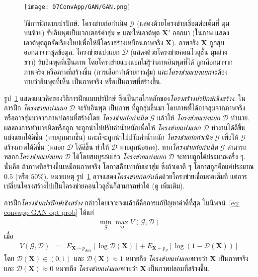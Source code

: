%
\begin{figure}
\begin{center}
\texttt{[image: 07ConvApp/GAN/GAN.png]}
\caption[วิธีการฝึกแบบปรปักษ์]{วิธีการฝึกแบบปรปักษ์. 
โครงข่ายก่อกำเนิด 
$\mathcal{G}$ (แสดงด้วยโครงข่ายเชื่อมต่อเต็มที่ มุมบนซ้าย) รับอินพุตเป็นเวกเตอร์ค่าสุ่ม $\bm{z}$
และให้เอาต์พุต $\bm{X}'$ ออกมา (ในภาพ แสดงเอาต์พุตถูกจัดเรียงใหม่เพื่อให้มีโครงสร้างเหมือนภาพจริง $\bm{X}$).
ภาพจริง $\bm{X}$ ถูกสุ่มออกมาจากชุดข้อมูล. 
โครงข่ายแบ่งแยก $\mathcal{D}$ (แสดงด้วยโครงข่ายคอนโวลูชั่น มุมล่างขวา)
รับอินพุตที่เป็นภาพ โดยโครงข่ายแบ่งแยกไม่รู้ว่าภาพอินพุตที่ได้ ถูกเลือกมาจากภาพจริง หรือภาพที่สร้างขึ้น
(การเลือกทำด้วยการสุ่ม) 
และ\textit{โครงข่ายแบ่งแยก}จะต้องทายว่าอินพุตที่เห็น เป็นภาพจริง หรือเป็นภาพที่สร้างขึ้น.
}
\label{fig: conv app GAN}
\end{center}
\end{figure}
%


รูป~\ref{fig: conv app GAN} แสดงแนวคิดของวิธีการฝึกแบบปรปักษ์ ซึ่งเป็นกลไกหลักของ\textit{โครงสร้างปรปักษ์เชิงสร้าง}.
%
ในการฝึก \textit{โครงข่ายแบ่งแยก} $\mathcal{D}$ จะรับอินพุต เป็นภาพ ที่ถูกสุ่มขึ้นมา โดยภาพที่ได้อาจสุ่มจากภาพจริง หรืออาจสุ่มมาจากภาพปลอมที่สร้างโดย \textit{โครงข่ายก่อกำเนิด} $\mathcal{G}$
แล้วให้ \textit{โครงข่ายแบ่งแยก} $\mathcal{D}$ ทำนาย.
ผลของการทำนายผิดหรือถูก จะถูกนำไปปรับค่าน้ำหนักเพื่อให้ \textit{โครงข่ายแบ่งแยก} $\mathcal{D}$ ทำงานได้ดีขึ้น แบ่งแยกได้ดีขึ้น (ทายถูกมากขึ้น)
และก็จะถูกนำไปปรับค่าน้ำหนัก \textit{โครงข่ายก่อกำเนิด} $\mathcal{G}$ เพื่อให้ $\mathcal{G}$ สร้างภาพได้ดีขึ้น (หลอก $\mathcal{D}$ ได้ดีขึ้น ทำให้ $\mathcal{D}$ ทายถูกน้อยลง).
หาก\textit{โครงข่ายก่อกำเนิด} $\mathcal{G}$ สามารถหลอก\textit{โครงข่ายแบ่งแยก} $\mathcal{D}$ ได้โดยสมบูรณ์แล้ว
\textit{โครงข่ายแบ่งแยก} $\mathcal{D}$ จะทายถูกได้ประมาณครึ่ง ๆ. 
นั่นคือ ถ้าภาพที่สร้างขึ้นเหมือนภาพจริง โอกาสคืิอเท่ากับเดาสุ่ม ซึ่งถ้าเดาดี ๆ โอกาสถูกคือแค่ประมาณ $0.5$ (หรือ $50\%$).
หมายเหตุ รูป~\ref{fig: conv app GAN} อาจแสดง\textit{โครงข่ายก่อกำเนิด}ด้วยโครงข่ายเชื่อมต่อเต็มที่
แต่การเปลี่ยนโครงสร้างไปเป็นโครงข่ายคอนโวลูชั่นก็สามารถทำได้ (ดู \cite{DCGAN, LAP-GAN} เพิ่มเติม).


การฝึก\textit{โครงข่ายปรปักษ์เชิงสร้าง} กล่าวโดยเจาะจงแล้วก็คือการแก้ปัญหาค่าดีที่สุด ในนิพจน์~\ref{eq: convapp GAN opt prob} ได้แก่
\begin{eqnarray}
\min_{\mathcal{G}} \max_{\mathcal{D}} V(\mathcal{G}, \mathcal{D})
\label{eq: convapp GAN opt prob}
\end{eqnarray}
เมื่อ
\begin{eqnarray}
V(\mathcal{G}, \mathcal{D}) &=& E_{\bm{X} \sim p_{data}}[\log \mathcal{D}(\bm{X})] 
+ E_{\bm{X} \sim p_{\mathcal{G}}}[\log(1 - \mathcal{D}(\bm{X}))]
\label{eq: convapp GAN obj function} 
\end{eqnarray}
โดย $\mathcal{D}(\bm{X}) \in (0,1)$
และ $\mathcal{D}(\bm{X}) \approx 1$ หมายถึง \textit{โครงข่ายแบ่งแยก}ทายว่า $\bm{X}$ เป็นภาพจริง
และ $\mathcal{D}(\bm{X}) \approx 0$ หมายถึง \textit{โครงข่ายแบ่งแยก}ทายว่า $\bm{X}$ เป็นภาพปลอมที่สร้างขึ้น.

